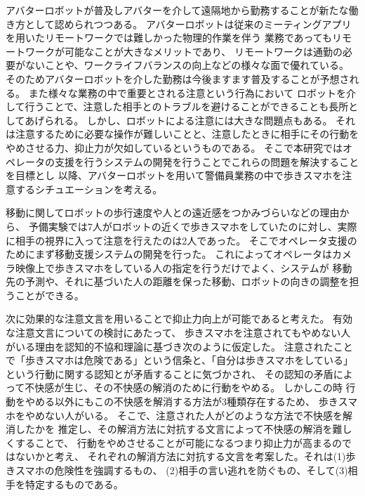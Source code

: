 \documentclass{kuisthesis}
\date{2024年1月31日}
\begin{document}
\maketitle

\begin{jabstract}


アバターロボットが普及しアバターを介して遠隔地から勤務することが新たな働き方として認められつつある。
アバターロボットは従来のミーティングアプリを用いたリモートワークでは難しかった物理的作業を伴う
業務であってもリモートワークが可能なことが大きなメリットであり、
リモートワークは通勤の必要がないことや、ワークライフバランスの向上などの様々な面で優れている。
そのためアバターロボットを介した勤務は今後ますます普及することが予想される。
また様々な業務の中で重要とされる注意という行為において
ロボットを介して行うことで、注意した相手とのトラブルを避けることができることも長所としてあげられる。
しかし、ロボットによる注意には大きな問題点もある。
それは注意するために必要な操作が難しいことと、注意したときに相手にその行動をやめさせる力、抑止力が欠如しているというものである。
そこで本研究ではオペレータの支援を行うシステムの開発を行うことでこれらの問題を解決することを目標とし
以降、アバターロボットを用いて警備員業務の中で歩きスマホを注意するシチュエーションを考える。

移動に関してロボットの歩行速度や人との遠近感をつかみづらいなどの理由から、
予備実験では7人がロボットの近くで歩きスマホをしていたのに対し、実際に相手の視界に入って注意を行えたのは2人であった。
そこでオペレータ支援のためにまず移動支援システムの開発を行った。
これによってオペレータはカメラ映像上で歩きスマホをしている人の指定を行うだけでよく、システムが
移動先の予測や、それに基づいた人の距離を保った移動、ロボットの向きの調整を担うことができる。

次に効果的な注意文言を用いることで抑止力向上が可能であると考えた。
有効な注意文言についての検討にあたって、
歩きスマホを注意されてもやめない人がいる理由を認知的不協和理論に基づき次のように仮定した。
注意されたことで「歩きスマホは危険である」という信条と、「自分は歩きスマホをしている」という行動に関する認知とが矛盾することに気づかされ、
その認知の矛盾によって不快感が生じ、その不快感の解消のために行動をやめる。
しかしこの時
行動をやめる以外にもこの不快感を解消する方法が3種類存在するため、
歩きスマホをやめない人がいる。
そこで、注意された人がどのような方法で不快感を解消したかを
推定し、その解消方法に対抗する文言によって不快感の解消を難しくすることで、
行動をやめさせることが可能になるつまり抑止力が高まるのではないかと考え、
それぞれの解消方法に対抗する文言を考案した。それは(1)歩きスマホの危険性を強調するもの、
(2)相手の言い逃れを防ぐもの、そして(3)相手を特定するものである。


\end{jabstract}
\end{document}
